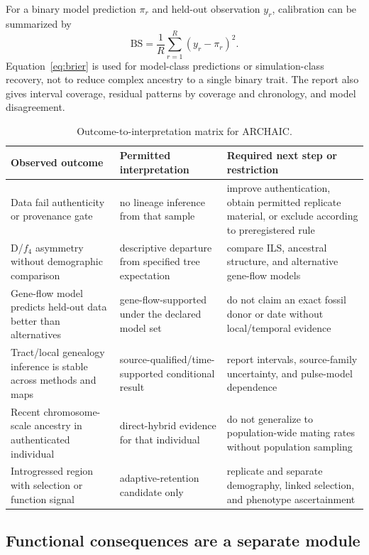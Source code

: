 \documentclass[conference]{IEEEtran}
\begin{document}
For a binary model prediction $\pi_r$ and held-out observation $y_r$, calibration can be summarized by
\begin{equation}
\label{eq:brier}
\mathrm{BS}=\frac{1}{R}\sum_{r=1}^{R}(y_r-\pi_r)^2.
\end{equation}
Equation~\eqref{eq:brier} is used for model-class predictions or simulation-class recovery, not to reduce complex ancestry to a single binary trait. The report also gives interval coverage, residual patterns by coverage and chronology, and model disagreement.

\begin{table}[t]
\caption{Outcome-to-interpretation matrix for ARCHAIC.}
\label{tab:outcomes}
\centering
\footnotesize
\begin{tabular}{L{0.27\textwidth} L{0.27\textwidth} L{0.31\textwidth}}
\toprule
Observed outcome & Permitted interpretation & Required next step or restriction \\
\midrule
Data fail authenticity or provenance gate & no lineage inference from that sample & improve authentication, obtain permitted replicate material, or exclude according to preregistered rule \\
D/$f_4$ asymmetry without demographic comparison & descriptive departure from specified tree expectation & compare ILS, ancestral structure, and alternative gene-flow models \\
Gene-flow model predicts held-out data better than alternatives & gene-flow-supported under the declared model set & do not claim an exact fossil donor or date without local/temporal evidence \\
Tract/local genealogy inference is stable across methods and maps & source-qualified/time-supported conditional result & report intervals, source-family uncertainty, and pulse-model dependence \\
Recent chromosome-scale ancestry in authenticated individual & direct-hybrid evidence for that individual & do not generalize to population-wide mating rates without population sampling \\
Introgressed region with selection or function signal & adaptive-retention candidate only & replicate and separate demography, linked selection, and phenotype ascertainment \\
\bottomrule
\end{tabular}
\end{table}

\subsection{Functional consequences are a separate module}
\end{document}
